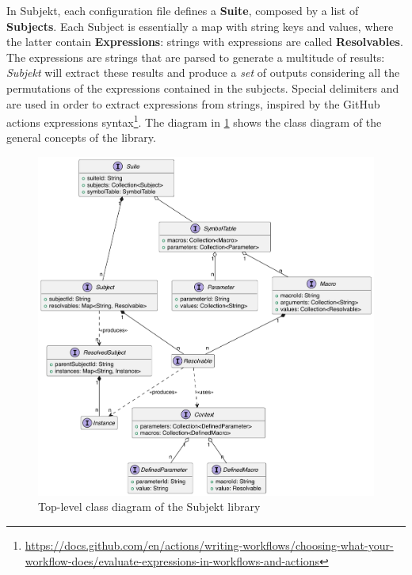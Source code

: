 \documentclass[12pt,a4paper,openright,twoside]{book}
\begin{document}
In Subjekt, each configuration file defines a \textbf{Suite}, composed by a list
of \textbf{Subjects}. Each Subject is essentially a map with string keys and
values, where the latter contain \textbf{Expressions}: strings with expressions
are called \textbf{Resolvables}. 
%
The expressions are strings that are parsed to generate a multitude of results:
\emph{Subjekt} will extract these results and produce a \emph{set} of outputs
considering all the permutations of the expressions contained in the subjects.
Special delimiters \code{\$\{\{} and \code{\}\}} are used in order to
extract expressions from strings, inspired by the GitHub actions expressions
syntax\footnote{
\url{https://docs.github.com/en/actions/writing-workflows/choosing-what-your-workflow-does/evaluate-expressions-in-workflows-and-actions}
}.
%
The diagram in \cref{fig:subjekt-structure} shows the class diagram of the
general concepts of the library.

\begin{figure}
  \centering
  \includegraphics[width=.8\linewidth]{figures/subjekt-structure.pdf}
  \caption{Top-level class diagram of the Subjekt library}
  \label{fig:subjekt-structure}
\end{figure}
\end{document}
